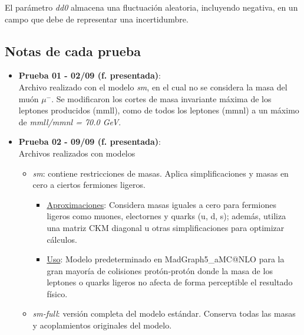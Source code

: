         El parámetro \textit{dd0} almacena una fluctuación aleatoria, incluyendo negativa, en un campo que debe de representar una incertidumbre.

    \subsection{Notas de cada prueba}
    \begin{itemize}
        \item[§] \textbf{Prueba 01 - 02/09 (f. presentada)}:\\
        Archivo realizado con el modelo \textit{sm}, en el cual no se considera la masa del muón $\mu^{-}$. Se modificaron los cortes de masa invariante máxima de los leptones producidos (mmll), como de todos los leptones (mmnl) a un máximo de \textit{mmll/mmnl = 70.0 GeV}.
        \item[§] \textbf{Prueba 02 - 09/09 (f. presentada)}:\\
        Archivos realizados con modelos
        \begin{itemize}
            \item \textit{sm}: contiene restricciones de masas. Aplica simplificaciones y masas en cero a ciertos fermiones ligeros.
            \begin{itemize}
                \item[$\rightarrow$] \underline{Aproximaciones}: Considera masas iguales a cero para fermiones ligeros como muones, electornes y quarks (u, d, s); además, utiliza una matriz CKM diagonal u otras simplificaciones para optimizar cálculos.
                \item[$\rightarrow$] \underline{Uso}: Modelo predeterminado en MadGraph5\_aMC@NLO para la gran mayoría de colisiones protón-protón donde la masa de los leptones o quarks ligeros no afecta de forma perceptible el resultado físico.
            \end{itemize}
            \item \textit{sm-full}: versión completa del modelo estándar. Conserva todas las masas y acoplamientos originales del modelo.

\end{itemize}
\end{itemize}
